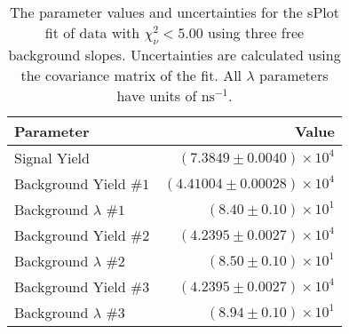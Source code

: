 
\begin{table}[ht]
    \begin{center}
        \begin{tabular}{lr}\toprule
            Parameter & Value \\\midrule
            Signal Yield & $(7.3849 \pm 0.0040) \times 10^{4}$ \\
            Background Yield $\#1$ & $(4.41004 \pm 0.00028) \times 10^{4}$ \\
            Background $\lambda$ $\#1$ & $(8.40 \pm 0.10) \times 10^{1}$ \\
            Background Yield $\#2$ & $(4.2395 \pm 0.0027) \times 10^{4}$ \\
            Background $\lambda$ $\#2$ & $(8.50 \pm 0.10) \times 10^{1}$ \\
            Background Yield $\#3$ & $(4.2395 \pm 0.0027) \times 10^{4}$ \\
            Background $\lambda$ $\#3$ & $(8.94 \pm 0.10) \times 10^{1}$ \\\bottomrule
        \end{tabular}
        \caption{The parameter values and uncertainties for the sPlot fit of data with $\chi^2_\nu < 5.00$ using three free background slopes. Uncertainties are calculated using the covariance matrix of the fit. All $\lambda$ parameters have units of $\si{\nano\second}^{-1}$.}\label{tab:splot-fit-results-chisqdof-5.00-free-3}
    \end{center}
\end{table}
